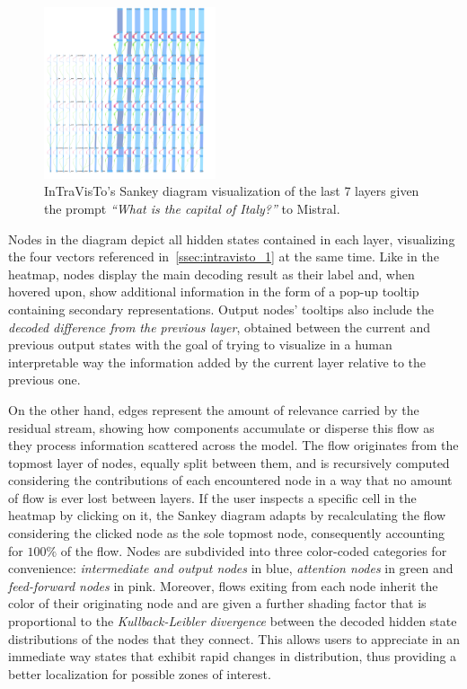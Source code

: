 \documentclass[11pt,a4paper,twocolumn]{article}
\begin{document}
\begin{figure}[tbh!]
    \centering
    \includegraphics[width=0.45\textwidth]{exp_intravisto_2A_sankey.png}
    \caption{InTraVisTo's Sankey diagram visualization of the last 7 layers given the prompt \emph{``What is the capital of Italy?''} to Mistral.}
    \label{fig:exp_intravisto_2_A}
    \vspace{-10pt}
\end{figure}

Nodes in the diagram depict all hidden states contained in each layer, visualizing the four vectors referenced in~\cref{ssec:intravisto_1} at the same time.
Like in the heatmap, nodes display the main decoding result as their label and, when hovered upon, show additional information in the form of a pop-up tooltip containing secondary representations.
Output nodes' tooltips also include the \emph{decoded difference from the previous layer}, obtained between the current and previous output states with the goal of trying to visualize in a human interpretable way the information added by the current layer relative to the previous one.

On the other hand, edges represent the amount of relevance carried by the residual stream, showing how components accumulate or disperse this flow as they process information scattered across the model.
The flow originates from the topmost layer of nodes, equally split between them, and is recursively computed considering the contributions of each encountered node in a way that no amount of flow is ever lost between layers.
If the user inspects a specific cell in the heatmap by clicking on it, the Sankey diagram adapts by recalculating the flow considering the clicked node as the sole topmost node, consequently accounting for $100\%$ of the flow.
Nodes are subdivided into three color-coded categories for convenience: \emph{intermediate and output nodes} in blue, \emph{attention nodes} in green and \emph{feed-forward nodes} in pink.
Moreover, flows exiting from each node inherit the color of their originating node and are given a further shading factor that is proportional to the \emph{Kullback-Leibler divergence} between the decoded hidden state distributions of the nodes that they connect.
This allows users to appreciate in an immediate way states that exhibit rapid changes in distribution, thus providing a better localization for possible zones of interest.
\end{document}
